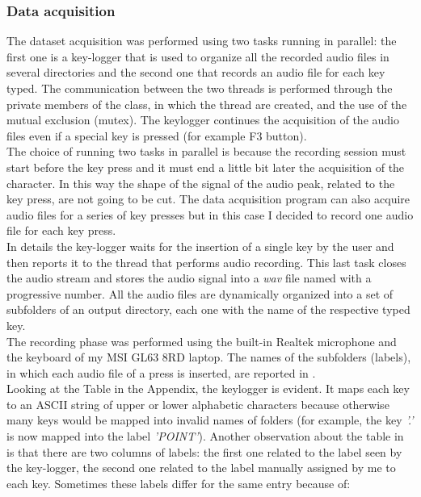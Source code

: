 \subsubsection{Data acquisition}
The dataset acquisition was performed using two tasks running in parallel: the first one is a key-logger that is used to organize all the recorded audio files in several directories and the second one that records an audio file for each key typed. The communication between the two threads is performed through the private members of the class, in which the thread are created, and the use of the mutual exclusion (mutex). The keylogger continues the acquisition of the audio files even if a special key is pressed (for example F3 button).\\
The choice of running two tasks in parallel is because the recording session must start before the key press and it must end a little bit later the acquisition of the character. In this way the shape of the signal of the audio peak, related to the key press, are not going to be cut. The data acquisition program can also acquire audio files for a series of key presses but in this case I decided to record one audio file for each key press.\\
In details the key-logger waits for the insertion of a single key by the user and then reports it to the thread that performs audio recording. This last task closes the audio stream and stores the audio signal into a \textit{wav} file named with a progressive number. All the audio files are dynamically organized into a set of subfolders of an output directory, each one with the name of the respective typed key.\\
The recording phase was performed using the built-in Realtek microphone and the keyboard of my MSI GL63 8RD laptop. The names of the subfolders (labels), in which each audio file of a press is inserted, are reported in .\\
Looking at the Table in the Appendix, the keylogger  is evident. It maps each key to an ASCII string of upper or lower alphabetic characters because otherwise many keys would be mapped into invalid names of folders (for example, the key \textit{'.'} is now mapped into the label \textit{'POINT'}). Another observation about the table in  is that there are two columns of labels: the first one related to the label seen by the key-logger, the second one related to the label manually assigned by me to each key. Sometimes these labels differ for the same entry because of:
